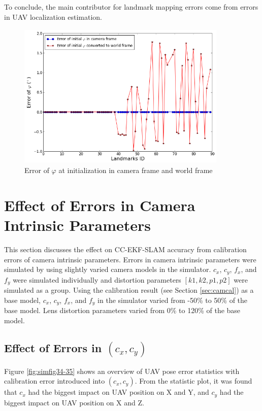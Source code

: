 To conclude, the main contributor for landmark mapping errors come
from errors in UAV localization estimation.

\begin{figure}[h] %
  \centering
  \includegraphics[width=10cm, height=7cm]{./Figures/SimulationFigures/Figure26.png}
  \caption{Error of $\varphi$ at initialization in camera frame and
    world frame}
  \label{fig:simfig26}
\end{figure}
\FloatBarrier

\section{Effect of Errors in Camera Intrinsic Parameters}
This section discusses the effect on CC-EKF-SLAM accuracy from
calibration errors of camera intrinsic parameters. Errors in camera
intrinsic parameters were simulated by using slightly varied camera
models in the simulator. $c_{x}$, $c_{y}$, $f_{x}$, and $f_{y}$ were
simulated individually and distortion parameters $[k1, k2, p1, p2]$
were simulated as a group. Using the calibration result (see Section
\ref{sec:camcal}) as a base model, $c_{x}$, $c_{y}$, $f_{x}$, and
$f_{y}$ in the simulator varied from -50\% to 50\% of the base model.
Lens distortion parameters varied from 0\% to 120\% of the base model.

\subsection{Effect of Errors in $(c_{x}, c_{y})$}
Figure \ref{fig:simfig34-35} shows an overview of UAV pose error
statistics with calibration error introduced into $(c_{x}, c_{y})$. From
the statistic plot, it was found that $c_x$ had the biggest impact on UAV
position on X and Y, and $c_y$ had the biggest impact on UAV position on X
and Z.

